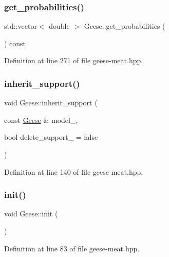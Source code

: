 \subsubsection{\texorpdfstring{get\+\_\+probabilities()}{get\_probabilities()}}
{\footnotesize\ttfamily std\+::vector$<$ double $>$ Geese\+::get\+\_\+probabilities (\begin{DoxyParamCaption}{ }\end{DoxyParamCaption}) const\hspace{0.3cm}{\ttfamily [inline]}}



Definition at line 271 of file geese-\/meat.\+hpp.

\mbox{\label{class_geese_aa95abe540b9977592bcc88e77619d070}} 
\subsubsection{\texorpdfstring{inherit\+\_\+support()}{inherit\_support()}}
{\footnotesize\ttfamily void Geese\+::inherit\+\_\+support (\begin{DoxyParamCaption}\item[{const \hyperlink{class_geese}{Geese} \&}]{model\+\_\+,  }\item[{bool}]{delete\+\_\+support\+\_\+ = {\ttfamily false} }\end{DoxyParamCaption})\hspace{0.3cm}{\ttfamily [inline]}}



Definition at line 140 of file geese-\/meat.\+hpp.

\mbox{\label{class_geese_ad830d504a390c6126c916e24dc16e69d}} 
\subsubsection{\texorpdfstring{init()}{init()}}
{\footnotesize\ttfamily void Geese\+::init (\begin{DoxyParamCaption}{ }\end{DoxyParamCaption})\hspace{0.3cm}{\ttfamily [inline]}}



Definition at line 83 of file geese-\/meat.\+hpp.

